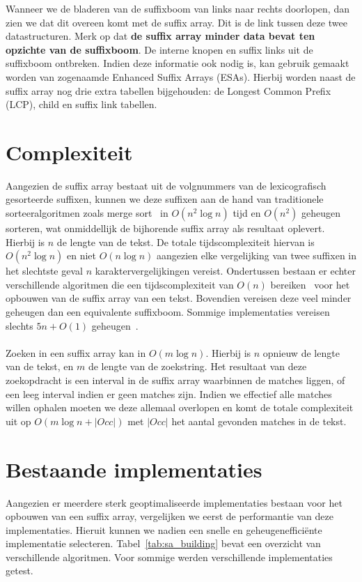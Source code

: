 Wanneer we de bladeren van de suffixboom van links naar rechts doorlopen, dan zien we dat dit overeen komt met de suffix array.
Dit is de link tussen deze twee datastructuren.
Merk op dat \textbf{de suffix array minder data bevat ten opzichte van de suffixboom}.
De interne knopen en suffix links uit de suffixboom ontbreken.
Indien deze informatie ook nodig is, kan gebruik gemaakt worden van zogenaamde Enhanced Suffix Arrays (ESAs).
Hierbij worden naast de suffix array nog drie extra tabellen bijgehouden: de Longest Common Prefix (LCP), child en suffix link tabellen.


\section{Complexiteit}\label{sec:complexiteit}
Aangezien de suffix array bestaat uit de volgnummers van de lexicografisch gesorteerde suffixen, kunnen we deze suffixen aan de hand van traditionele sorteeralgoritmen zoals merge sort~\cite{mergeSort} in $O(n^2 \log n)$ tijd en $O(n^2)$ geheugen sorteren, wat onmiddellijk de bijhorende suffix array als resultaat oplevert.
Hierbij is $n$ de lengte van de tekst.
De totale tijdscomplexiteit hiervan is $O(n^2 \log n)$ en niet $O(n \log n)$ aangezien elke vergelijking van twee suffixen in het slechtste geval $n$ karaktervergelijkingen vereist.
Ondertussen bestaan er echter verschillende algoritmen die een tijdscomplexiteit van $O(n)$ bereiken~\cite{sais, ko_alura, radixSA, dark_archon, libdivsufsort} voor het opbouwen van de suffix array van een tekst.
Bovendien vereisen deze veel minder geheugen dan een equivalente suffixboom.
Sommige implementaties vereisen slechts $5n + O(1)$ geheugen~\cite{dark_archon, libdivsufsort, libsais}.
\\ \\
Zoeken in een suffix array kan in $O(m \log n)$.
Hierbij is $n$ opnieuw de lengte van de tekst, en $m$ de lengte van de zoekstring.
Het resultaat van deze zoekopdracht is een interval in de suffix array waarbinnen de matches liggen, of een leeg interval indien er geen matches zijn.
Indien we effectief alle matches willen ophalen moeten we deze allemaal overlopen en komt de totale complexiteit uit op $O(m \log n + |Occ|)$ met $|Occ|$ het aantal gevonden matches in de tekst.


\section{Bestaande implementaties}\label{sec:bestaande-implementaties}
Aangezien er meerdere sterk geoptimaliseerde implementaties bestaan voor het opbouwen van een suffix array, vergelijken we eerst de performantie van deze implementaties.
Hieruit kunnen we nadien een snelle en geheugenefficiënte implementatie selecteren.
Tabel~\ref{tab:sa_building} bevat een overzicht van verschillende algoritmen.
Voor sommige werden verschillende implementaties getest.

